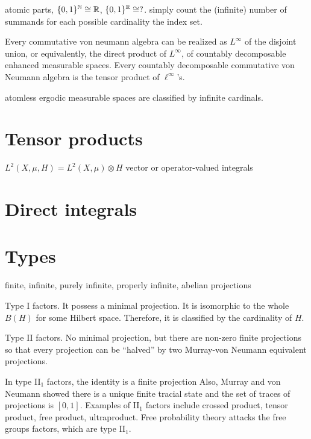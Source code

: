 \documentclass{../../large}
\begin{document}
\begin{prb}
atomic parts, $\{0,1\}^{\mathbb{N}}\cong\mathbb{R}$, $\{0,1\}^{\mathbb{R}}\cong?$.
simply count the (infinite) number of summands for each possible cardinality the index set.
\end{prb}

Every commutative von neumann algebra can be realized as $L^\infty$ of the disjoint union, or equivalently, the direct product of $L^\infty$, of countably decomposable enhanced measurable spaces.
Every countably decomposable commutative von Neumann algebra is the tensor product of $\ell^\infty$'s.



atomless ergodic measurable spaces are classified by infinite cardinals.

\section{Tensor products}

$L^2(X,\mu,H)=L^2(X,\mu)\otimes H$
vector or operator-valued integrals


\section{Direct integrals}

\begin{prb}
\end{prb}

\begin{prb}
\end{prb}




\section{Types}


finite, infinite, purely infinite, properly infinite, abelian projections



Type I factors.
It possess a minimal projection.
It is isomorphic to the whole $B(H)$ for some Hilbert space.
Therefore, it is classified by the cardinality of $H$.

Type II factors.
No minimal projection, but there are non-zero finite projections so that every projection can be ``halved'' by two Murray-von Neumann equivalent projections.

In type II$_1$ factors, the identity is a finite projection
Also, Murray and von Neumann showed there is a unique finite tracial state and the set of traces of projections is $[0,1]$.
Examples of II$_1$ factors include crossed product, tensor product, free product, ultraproduct.
Free probability theory attacks the free groups factors, which are type II$_1$.
\end{document}
